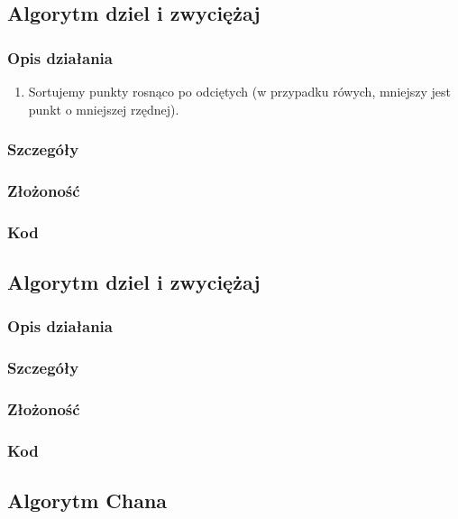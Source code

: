\documentclass[11pt]{article}
\theoremstyle{remark} \newtheorem{definition}{def.}
\theoremstyle{definition} \newtheorem{twierdzenie}{tw.}
\begin{document}
\subsection{Algorytm dziel i zwyciężaj}
    \subsubsection{Opis działania}
    \begin{enumerate}
        \item   Sortujemy punkty rosnąco po odciętych (w przypadku rówych, mniejszy jest punkt o mniejszej rzędnej).
    \end{enumerate}
    \subsubsection{Szczegóły}
    \subsubsection{Złożoność}
    \subsubsection{Kod}



    \subsection{Algorytm dziel i zwyciężaj}
    \subsubsection{Opis działania}
    \subsubsection{Szczegóły}
    \subsubsection{Złożoność}
    \subsubsection{Kod}



\subsection{Algorytm Chana}
\end{document}
